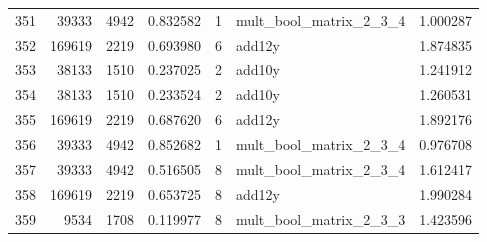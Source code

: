 \begin{tabular}{lrrrrlr}
351 & 39333 & 4942 & 0.832582 & 1 & mult_bool_matrix_2_3_4 & 1.000287 \\
352 & 169619 & 2219 & 0.693980 & 6 & add12y & 1.874835 \\
353 & 38133 & 1510 & 0.237025 & 2 & add10y & 1.241912 \\
354 & 38133 & 1510 & 0.233524 & 2 & add10y & 1.260531 \\
355 & 169619 & 2219 & 0.687620 & 6 & add12y & 1.892176 \\
356 & 39333 & 4942 & 0.852682 & 1 & mult_bool_matrix_2_3_4 & 0.976708 \\
357 & 39333 & 4942 & 0.516505 & 8 & mult_bool_matrix_2_3_4 & 1.612417 \\
358 & 169619 & 2219 & 0.653725 & 8 & add12y & 1.990284 \\
359 & 9534 & 1708 & 0.119977 & 8 & mult_bool_matrix_2_3_3 & 1.423596 \\
\end{tabular}
